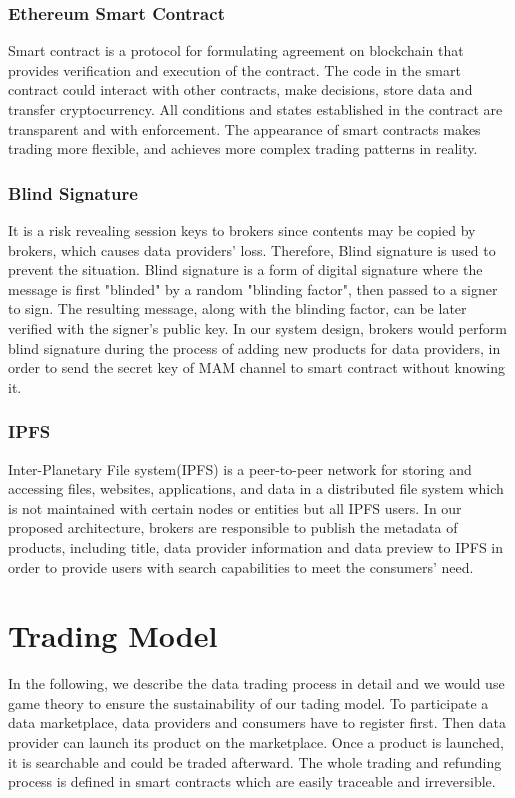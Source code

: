 \documentclass[journal,10pt,a4paper]{IEEEtran}
\begin{document}
\subsubsection{Ethereum Smart Contract}
Smart contract is a protocol for formulating agreement on blockchain that provides verification and execution of the contract. The code in the smart contract could interact with other contracts, make decisions, store data and transfer cryptocurrency. All conditions and states established in the contract are transparent and with enforcement. The appearance of smart contracts makes trading more flexible, and achieves more complex trading patterns in reality.

\subsubsection{Blind Signature}
 It is a risk revealing session keys to brokers since contents may be copied by brokers, which causes data providers' loss. Therefore, Blind signature is used to prevent the situation. Blind signature\cite{blindSig} is a form of digital signature where the message is first "blinded" by a random "blinding factor", then passed to a signer to sign. The resulting message, along with the blinding factor, can be later verified with the signer's public key. In our system design, brokers would perform blind signature during the process of adding new products for data providers, in order to send the secret key of MAM channel to smart contract without knowing it.

\subsubsection{IPFS}
Inter-Planetary File system(IPFS)\cite{IPFS} is a peer-to-peer network for storing and accessing files, websites, applications, and data in a distributed file system which is not maintained with certain nodes or entities but all IPFS users. In our proposed architecture, brokers are responsible to publish the metadata of products, including title, data provider information and data preview to IPFS in order to provide users with search capabilities to meet the consumers' need.

\section{\normalsize\textbf{Trading Model}}
In the following, we describe the data trading process in detail and we would use game theory to ensure the sustainability of our tading model. To participate a data marketplace, data providers and consumers have to register first. Then data provider can launch its product on the marketplace. Once a product is launched, it is searchable and could be traded afterward. The whole trading and refunding process is defined in smart contracts which are easily traceable and irreversible.
\end{document}
